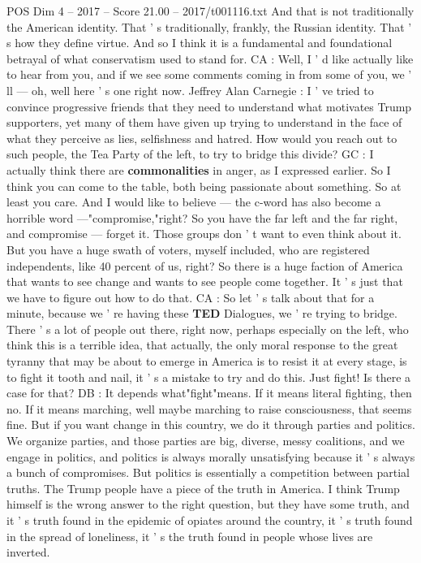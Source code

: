 \begin{textsample}{POS Dim 4 – 2017 – Score 21.00 – 2017/t001116.txt}
And that is not traditionally the American identity.
That ' s traditionally, frankly, the Russian identity.
That ' s how they define virtue.
And so I think it is a fundamental and foundational betrayal of what conservatism used to stand for.
CA : Well, I ' d like actually like to hear from you, and if we see some comments coming in from some of you, we ' ll — oh, well here ' s one right now.
Jeffrey Alan Carnegie : I ' ve tried to convince progressive friends that they need to understand what motivates Trump supporters, yet many of them have given up trying to understand in the face of what they perceive as lies, selfishness and hatred.
How would you reach out to such people, the Tea Party of the left, to try to bridge this divide?
GC : I actually think there are \textbf{commonalities} in anger, as I expressed earlier.
So I think you can come to the table, both being passionate about something.
So at least you care.
And I would like to believe — the c-word has also become a horrible word —"compromise,"right?
So you have the far left and the far right, and compromise — forget it.
Those groups don ' t want to even think about it.
But you have a huge swath of voters, myself included, who are registered independents, like 40 percent of us, right?
So there is a huge faction of America that wants to see change and wants to see people come together.
It ' s just that we have to figure out how to do that.
CA : So let ' s talk about that for a minute, because we ' re having these \textbf{TED} Dialogues, we ' re trying to bridge.
There ' s a lot of people out there, right now, perhaps especially on the left, who think this is a terrible idea, that actually, the only moral response to the great tyranny that may be about to emerge in America is to resist it at every stage, is to fight it tooth and nail, it ' s a mistake to try and do this.
Just fight!
Is there a case for that?
DB : It depends what"fight"means.
If it means literal fighting, then no.
If it means marching, well maybe marching to raise consciousness, that seems fine.
But if you want change in this country, we do it through parties and politics.
We organize parties, and those parties are big, diverse, messy coalitions, and we engage in politics, and politics is always morally unsatisfying because it ' s always a bunch of compromises.
But politics is essentially a competition between partial truths.
The Trump people have a piece of the truth in America.
I think Trump himself is the wrong answer to the right question, but they have some truth, and it ' s truth found in the epidemic of opiates around the country, it ' s truth found in the spread of loneliness, it ' s the truth found in people whose lives are inverted.

\end{textsample}
